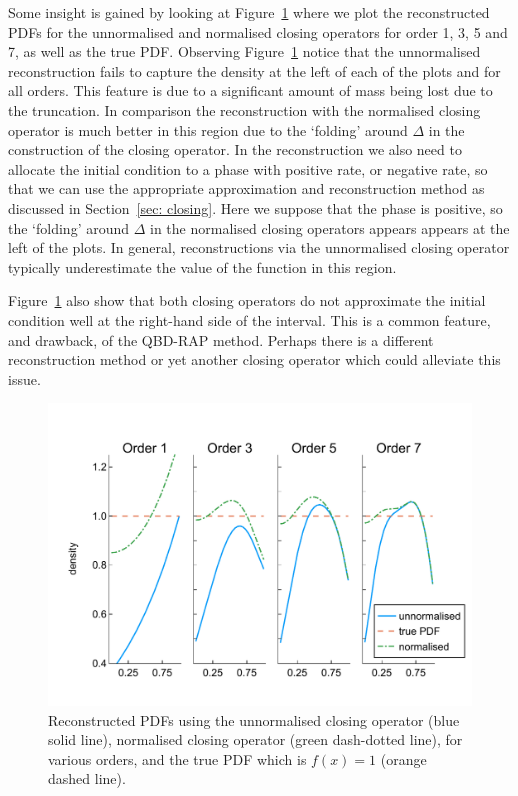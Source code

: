 \begin{example}
Some insight is gained by looking at Figure~\ref{fig: pdf reconstructed} where we plot the reconstructed PDFs for the unnormalised and normalised closing operators for order 1, 3, 5 and 7, as well as the true PDF. Observing Figure~\ref{fig: pdf reconstructed} notice that the unnormalised reconstruction fails to capture the density at the left of each of the plots and for all orders. This feature is due to a significant amount of mass being lost due to the truncation. In comparison the reconstruction with the normalised closing operator is much better in this region due to the `folding' around \(\Delta\) in the construction of the closing operator. In the reconstruction we also need to allocate the initial condition to a phase with positive rate, or negative rate, so that we can use the appropriate approximation and reconstruction method as discussed in Section~\ref{sec: closing}. Here we suppose that the phase is positive, so the `folding' around \(\Delta\) in the normalised closing operators appears appears at the left of the plots. In general, reconstructions via the unnormalised closing operator typically underestimate the value of the function in this region. 

Figure~\ref{fig: pdf reconstructed} also show that both closing operators do not approximate the initial condition well at the right-hand side of the interval. This is a common feature, and drawback, of the QBD-RAP method. Perhaps there is a different reconstruction method or yet another closing operator which could alleviate this issue. 
\begin{figure}
	\centering
	\includegraphics[width=\textwidth]{chapter6/figs/qbdrap_closing_vec/fun4/pdfs_formatted.pdf}
	\caption{Reconstructed PDFs using the unnormalised closing operator (blue solid line), normalised closing operator (green dash-dotted line), for various orders, and the true PDF which is \(f(x)=1\) (orange dashed line).}
	\label{fig: pdf reconstructed}
\end{figure} 
\end{example}

